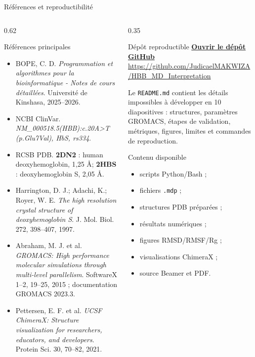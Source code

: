 \documentclass[aspectratio=169,10pt]{beamer}
\begin{document}
\begin{frame}[shrink=2]{Références et reproductibilité}
\small
\begin{columns}[T,totalwidth=\textwidth]
\begin{column}{0.62\textwidth}
\begin{block}{Références principales}
\tiny
\begin{itemize}
  \item BOPE, C. D. \textit{Programmation et algorithmes pour la bioinformatique - Notes de cours détaillées}. Université de Kinshasa, 2025--2026.
  \item NCBI ClinVar. \textit{NM\_000518.5(HBB):c.20A>T (p.Glu7Val), HbS, rs334}.
  \item RCSB PDB. \textbf{2DN2} : human deoxyhemoglobin, 1,25 \AA ; \textbf{2HBS} : deoxyhemoglobin S, 2,05 \AA.
  \item Harrington, D. J.; Adachi, K.; Royer, W. E. \textit{The high resolution crystal structure of deoxyhemoglobin S}. J. Mol. Biol. 272, 398--407, 1997.
  \item Abraham, M. J. et al. \textit{GROMACS: High performance molecular simulations through multi-level parallelism}. SoftwareX 1--2, 19--25, 2015 ; documentation GROMACS 2023.3.
  \item Pettersen, E. F. et al. \textit{UCSF ChimeraX: Structure visualization for researchers, educators, and developers}. Protein Sci. 30, 70--82, 2021.
\end{itemize}
\end{block}
\end{column}
\begin{column}{0.35\textwidth}
\begin{block}{Dépôt reproductible}
\footnotesize
\href{https://github.com/JudicaelMAKWIZA/HBB_MD_Interpretation}{\textcolor{UniBlue}{\textbf{Ouvrir le dépôt GitHub}}}\\[0.45em]
\scriptsize\url{https://github.com/JudicaelMAKWIZA/HBB_MD_Interpretation}
\vspace{0.45em}

Le \texttt{README.md} contient les détails impossibles à développer en 10 diapositives : structures, paramètres GROMACS, étapes de validation, métriques, figures, limites et commandes de reproduction.
\end{block}
\begin{block}{Contenu disponible}
\scriptsize
\begin{itemize}
  \item scripts Python/Bash ;
  \item fichiers \texttt{.mdp} ;
  \item structures PDB préparées ;
  \item résultats numériques ;
  \item figures RMSD/RMSF/Rg ;
  \item visualisations ChimeraX ;
  \item source Beamer et PDF.
\end{itemize}
\end{block}
\end{column}
\end{columns}
\end{frame}
\end{document}
